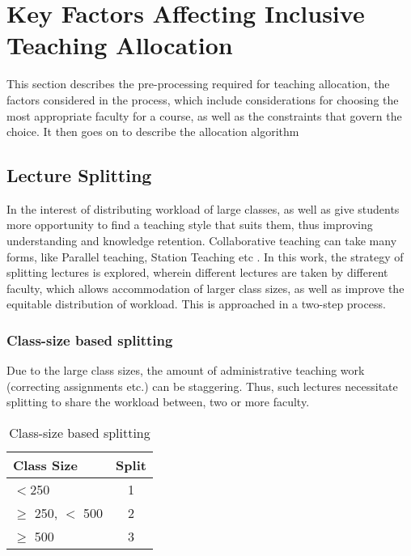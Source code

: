 \chapter{Key Factors Affecting Inclusive Teaching Allocation}

This section describes the  pre-processing required for teaching allocation, the factors considered in the process, which include considerations for choosing the most appropriate faculty for a course, as well as the constraints that govern the choice. It then goes on to describe the allocation algorithm

\section{Lecture Splitting}
\label{chapter:lecture_splitting}

In the interest of distributing workload of large classes, as well as give students more opportunity to find a teaching style that suits them, thus improving understanding and knowledge retention. Collaborative teaching can take many forms, like Parallel teaching, Station Teaching etc \cite{forbes2012successful}. In this work, the strategy of splitting lectures is explored, wherein different lectures are taken by different faculty, which allows accommodation of larger class sizes, as well as improve the equitable distribution of workload. This is approached in a two-step process.

\subsection{Class-size based splitting}
Due to the large class sizes, the amount of administrative teaching work (correcting assignments etc.) can be staggering. Thus, such lectures necessitate splitting to share the workload between, two or more faculty.

\begin{table}
    \centering
    \begin{tabular}{|l|c|}
        \hline
        Class Size             & Split \\
        \hline
        \(<\)250               & 1     \\
        \(\ge\) 250, \(<\) 500 & 2     \\
        \(\ge\) 500            & 3     \\
        \hline
    \end{tabular}
    \caption{Class-size based splitting}
    \label{class_size_splitting}
\end{table}

